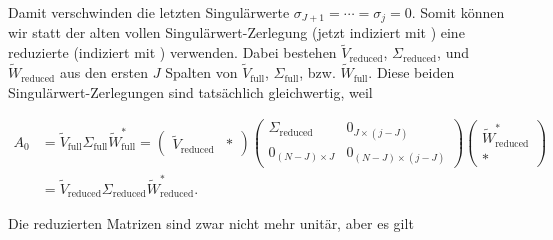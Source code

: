 Damit verschwinden die letzten Singulärwerte $\sigma_{J+1} = \cdots = \sigma_j = 0$.
Somit können wir statt der alten vollen Singulärwert-Zerlegung (jetzt indiziert mit ) eine reduzierte (indiziert mit ) verwenden.
Dabei bestehen $\tilde V_\mathrm{reduced}$, $\Sigma_\mathrm{reduced}$, und $\tilde W_\mathrm{reduced}$ aus den ersten $J$ Spalten von $\tilde V_\mathrm{full}$, $\Sigma_\mathrm{full}$, bzw. $\tilde W_\mathrm{full}$.
Diese beiden Singulärwert-Zerlegungen sind tatsächlich gleichwertig, weil

\begin{align*}
    A_0
    & =
    \tilde V_\mathrm{full} \Sigma_\mathrm{full} \tilde W_\mathrm{full}^\ast
    =
    \begin{pmatrix}
        \tilde V_\mathrm{reduced} & \ast
    \end{pmatrix}
    \begin{pmatrix}
        \Sigma_\mathrm{reduced} & 0_{J \times (j - J)} \\
        0_{(N - J) \times J}    & 0_{(N - J) \times (j - J)}
    \end{pmatrix}
    \begin{pmatrix}
        \tilde W_\mathrm{reduced}^\ast \\ \ast
    \end{pmatrix} \\
    & =
    \tilde V_\mathrm{reduced} \Sigma_\mathrm{reduced} \tilde W_\mathrm{reduced}^\ast.
\end{align*}

Die reduzierten Matrizen sind zwar nicht mehr unitär, aber es gilt

